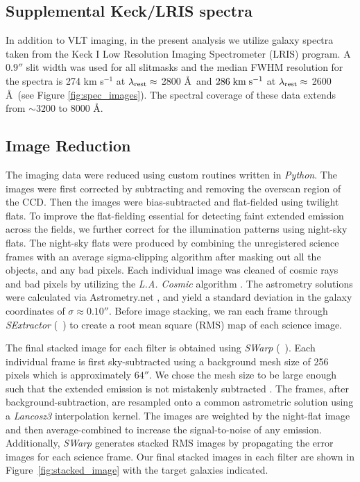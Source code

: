 \documentclass[twocolumn]{aastex61}
\newcommand{\citeth}[1]{(\citeauthor{#1}\ \citeyear{#1})}
\def \mkms {{\rm \; km\;s^{-1}}}
\begin{document}
\subsection{Supplemental Keck/LRIS spectra}
In addition to VLT imaging, in the present analysis we utilize galaxy spectra taken from the \cite{Rubin_2014} Keck I Low Resolution Imaging Spectrometer (LRIS) program.  A $0.9''$ slit width was used for all slitmasks and the median FWHM resolution for the spectra is 274 km s$^{-1}$ at $\lambda_{\rm rest} \approx$ 2800 \AA\ and $286\mkms$  at $\lambda_{\rm rest}\approx$ 2600 \AA\ (see Figure \ref{fig:spec_images}).  The spectral coverage of these data extends from ${\sim}3200$ to 8000 \AA.

\subsection{Image Reduction}
The imaging data were reduced using custom routines written in \emph{Python}. 
The images were first corrected by subtracting and removing the overscan region of the CCD. 
Then the images were bias-subtracted and flat-fielded using twilight flats.
To improve the flat-fielding essential for detecting faint extended emission across the fields, we further correct for the illumination patterns using night-sky flats. The night-sky flats were produced by combining the unregistered science frames with an average sigma-clipping algorithm after masking out all the objects, and any bad pixels. Each individual image was cleaned of cosmic rays and bad pixels by utilizing the \emph{L.A. Cosmic} algorithm \citep{Dokkum2001}.
The astrometry solutions were calculated via Astrometry.net \citep{Lang}, and yield a standard deviation in the galaxy coordinates of $\sigma \approx 0.10''$. Before image stacking, we ran each frame through \emph{SExtractor} \citeth{Bertin} to create a root mean square (RMS) map of each science image.


The final stacked image for each filter is obtained using \emph{SWarp} \citeth{Bertin}.
Each individual frame is first sky-subtracted using a background mesh size of 256 pixels which is approximately $64''$. 
We chose the mesh size to be large enough such that the extended emission is not mistakenly subtracted \citep{Battaia_2015}. 
The frames, after background-subtraction, are resampled onto a common astrometric solution using a \textit{Lancosz3} interpolation kernel. 
The images are weighted by the night-flat image and then  average-combined to increase the signal-to-noise of any  emission. Additionally, \emph{SWarp} generates stacked RMS images by propagating the error images for each science frame.
Our final stacked images in each filter are shown in Figure~\ref{fig:stacked_image} with the target galaxies indicated.  
\end{document}
